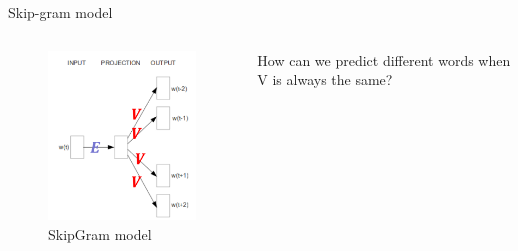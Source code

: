 \documentclass[12pt]{beamer}
\begin{document}
\begin{frame}{Skip-gram model}
	
\begin{columns}
	
	\begin{column}{4cm}
		\begin{figure}
			\includegraphics[width=\linewidth]{img/skipgram1.png}
			\caption{SkipGram model}
		\end{figure}
	\end{column}
	
	\begin{column}{4cm}
How can we predict different words when V is always the same?
	\end{column}
	
\end{columns}
	
\end{frame}
\end{document}
